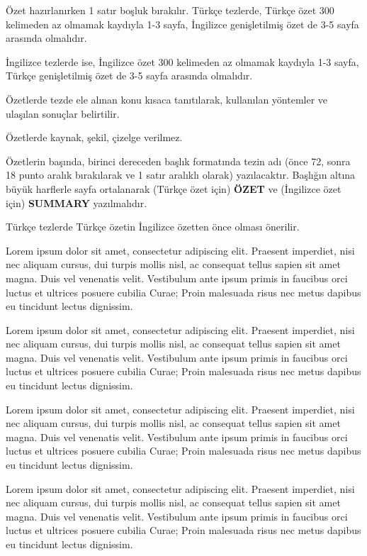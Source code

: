 \"Ozet haz\i rlan\i rken 1 sat\i r bo\c{s}luk b\i rak\i l\i r. T\"urk\c{c}e
tezlerde, T\"urk\c{c}e \"ozet 300 kelimeden az olmamak kayd\i yla 1-3 sayfa,
{\.I}ngilizce geni\c{s}letilmi\c{s} \"ozet de 3-5 sayfa aras\i nda 
olmal\i d\i r. 

{\.I}ngilizce tezlerde ise, {\.I}ngilizce \"ozet 300 kelimeden az olmamak
kayd\i yla 1-3 sayfa, T\"urk\c{c}e geni\c{s}letilmi\c{s} \"ozet de 
3-5 sayfa aras\i nda olmal\i d\i r. 

\"Ozetlerde tezde ele al\i nan konu k\i saca tan\i t\i larak, kullan\i lan
y\"ontemler ve ula\c{s}\i lan sonu\c{c}lar belirtilir.

\"Ozetlerde kaynak, \c{s}ekil, \c{c}izelge verilmez.

\"Ozetlerin ba\c{s}\i nda, birinci dereceden ba\c{s}l\i k format\i nda
tezin ad{\i} (\"once 72, sonra 18 punto aral\i k b{\i}rak{\i}larak ve 1
sat\i r aral\i kl{\i} olarak) yaz\i lacakt\i r. Ba\c{s}l\i \u{g}\i n
alt\i na b\"uy\"uk harflerle sayfa ortalanarak (T\"urk\c{c}e \"ozet i\c{c}in)
{\bf \"OZET} ve ({\.I}ngilizce \"ozet i\c{c}in) {\bf SUMMARY}
yaz\i lmal\i d\i r.

T\"urk\c{c}e tezlerde T\"urk\c{c}e \"ozetin \.Ingilizce \"ozetten 
\"once olmas{\i} \"onerilir.

Lorem ipsum dolor sit amet, consectetur adipiscing elit. Praesent imperdiet, nisi 
nec aliquam cursus, dui turpis mollis nisl, ac consequat tellus sapien sit amet 
magna. Duis vel venenatis velit. Vestibulum ante ipsum primis in faucibus orci 
luctus et ultrices posuere cubilia Curae; Proin malesuada risus nec metus dapibus 
eu tincidunt lectus dignissim. 

Lorem ipsum dolor sit amet, consectetur adipiscing elit. Praesent imperdiet, nisi 
nec aliquam cursus, dui turpis mollis nisl, ac consequat tellus sapien sit amet 
magna. Duis vel venenatis velit. Vestibulum ante ipsum primis in faucibus orci 
luctus et ultrices posuere cubilia Curae; Proin malesuada risus nec metus dapibus 
eu tincidunt lectus dignissim. 

Lorem ipsum dolor sit amet, consectetur adipiscing elit. Praesent imperdiet, nisi 
nec aliquam cursus, dui turpis mollis nisl, ac consequat tellus sapien sit amet 
magna. Duis vel venenatis velit. Vestibulum ante ipsum primis in faucibus orci 
luctus et ultrices posuere cubilia Curae; Proin malesuada risus nec metus dapibus 
eu tincidunt lectus dignissim. 

Lorem ipsum dolor sit amet, consectetur adipiscing elit. Praesent imperdiet, nisi 
nec aliquam cursus, dui turpis mollis nisl, ac consequat tellus sapien sit amet 
magna. Duis vel venenatis velit. Vestibulum ante ipsum primis in faucibus orci 
luctus et ultrices posuere cubilia Curae; Proin malesuada risus nec metus dapibus 
eu tincidunt lectus dignissim. 

